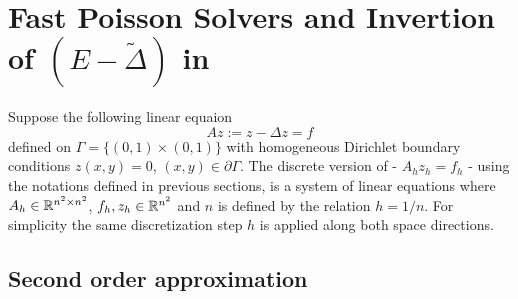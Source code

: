 \documentclass[11pt,a4paper,twoside]{article}
\begin{document}
\section{Fast Poisson Solvers and Invertion of $(E-\tilde \Delta)$ in }\label{FPSsection}
Suppose the following linear equaion
\begin{equation}\label{FPeq}
Az:=z-\Delta z = f
\end{equation}
defined on $\Gamma = \{ (0,1) \times (0,1) \}$ with homogeneous Dirichlet boundary conditions $z(x,y) = 0$, $(x,y) \in \partial \Gamma$. The discrete version of  - $A_h z_h = f_h$ - using the notations defined in previous sections, is a system of linear equations where $A_h \in \mathbb{R}^{n^2 \times n^2}$, $f_h, z_h \in \mathbb{R}^{n^2}$ and $n$ is defined by the relation $h=1/n$. For simplicity the same discretization step $h$ is applied along both space directions.
\subsection{Second order approximation}
\end{document}
